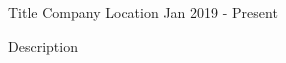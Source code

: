 
\begin{cventries}
  \cventry
    {Title} %
    {Company} %
    {Location} %
    {Jan 2019 {-} Present} %
    {
      \begin{cvitems}
        \item{Description}
      \end{cvitems}
    }

\end{cventries}